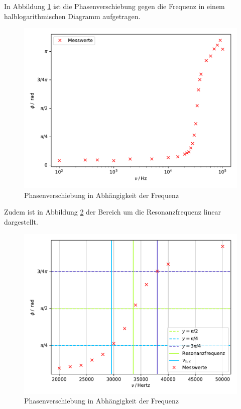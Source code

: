 \noindent In Abbildung \ref{fig:phase} ist die Phasenverschiebung gegen die Frequenz
in einem halblogarithmischen Diagramm aufgetragen.

\begin{figure}[H]
  \centering
  \includegraphics{plot4.pdf}
  \caption{Phasenverschiebung in Abhängigkeit der Frequenz}
  \label{fig:phase}
\end{figure}

Zudem ist in Abbildung \ref{fig:plot4} der Bereich um die Resonanzfrequenz linear
dargestellt.

\begin{figure}[H]
  \centering
  \includegraphics{plot5.pdf}
  \caption{Phasenverschiebung in Abhängigkeit der Frequenz}
  \label{fig:plot4}
\end{figure}

